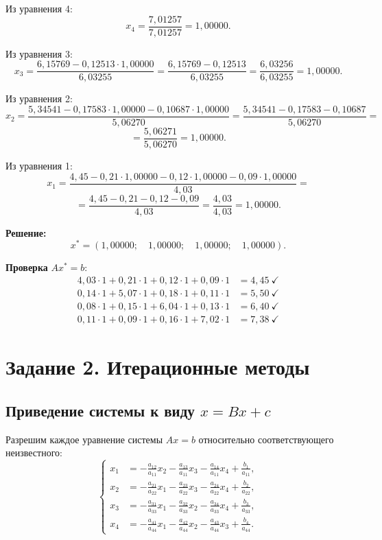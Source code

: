 \documentclass[a4paper, final]{article}
\begin{document}
Из уравнения 4:
\[
x_4 = \frac{7{,}01257}{7{,}01257} = 1{,}00000.
\]

Из уравнения 3:
\[
x_3 = \frac{6{,}15769 - 0{,}12513 \cdot 1{,}00000}{6{,}03255}
     = \frac{6{,}15769 - 0{,}12513}{6{,}03255}
     = \frac{6{,}03256}{6{,}03255} = 1{,}00000.
\]

Из уравнения 2:
\[
x_2 = \frac{5{,}34541 - 0{,}17583 \cdot 1{,}00000 - 0{,}10687 \cdot 1{,}00000}{5{,}06270}
     = \frac{5{,}34541 - 0{,}17583 - 0{,}10687}{5{,}06270}= \]
     \[= \frac{5{,}06271}{5{,}06270} = 1{,}00000.
\]

Из уравнения 1:
\[
x_1 = \frac{4{,}45 - 0{,}21 \cdot 1{,}00000 - 0{,}12 \cdot 1{,}00000 - 0{,}09 \cdot 1{,}00000}{4{,}03} = \]
     \[= \frac{4{,}45 - 0{,}21 - 0{,}12 - 0{,}09}{4{,}03}
     = \frac{4{,}03}{4{,}03} = 1{,}00000.
\]

\textbf{Решение:}
\[
\boxed{x^* = (1{,}00000;\quad 1{,}00000;\quad 1{,}00000;\quad 1{,}00000).}
\]

\textbf{Проверка} $Ax^* = b$:
\begin{align*}
4{,}03\cdot1 + 0{,}21\cdot1 + 0{,}12\cdot1 + 0{,}09\cdot1 &= 4{,}45\ \checkmark\\
0{,}14\cdot1 + 5{,}07\cdot1 + 0{,}18\cdot1 + 0{,}11\cdot1 &= 5{,}50\ \checkmark\\
0{,}08\cdot1 + 0{,}15\cdot1 + 6{,}04\cdot1 + 0{,}13\cdot1 &= 6{,}40\ \checkmark\\
0{,}11\cdot1 + 0{,}09\cdot1 + 0{,}16\cdot1 + 7{,}02\cdot1 &= 7{,}38\ \checkmark
\end{align*}

\newpage

\section{Задание 2. Итерационные методы}

\subsection{Приведение системы к виду $x = Bx + c$}

Разрешим каждое уравнение системы $Ax = b$ относительно
соответствующего неизвестного:
\[
\left\{
\begin{aligned}
x_1 &= -\frac{a_{12}}{a_{11}}x_2 - \frac{a_{13}}{a_{11}}x_3 - \frac{a_{14}}{a_{11}}x_4
        + \frac{b_1}{a_{11}},\\
x_2 &= -\frac{a_{21}}{a_{22}}x_1 - \frac{a_{23}}{a_{22}}x_3 - \frac{a_{24}}{a_{22}}x_4
        + \frac{b_2}{a_{22}},\\
x_3 &= -\frac{a_{31}}{a_{33}}x_1 - \frac{a_{32}}{a_{33}}x_2 - \frac{a_{34}}{a_{33}}x_4
        + \frac{b_3}{a_{33}},\\
x_4 &= -\frac{a_{41}}{a_{44}}x_1 - \frac{a_{42}}{a_{44}}x_2
        - \frac{a_{43}}{a_{44}}x_3 + \frac{b_4}{a_{44}}.
\end{aligned}
\right.
\]
\end{document}
